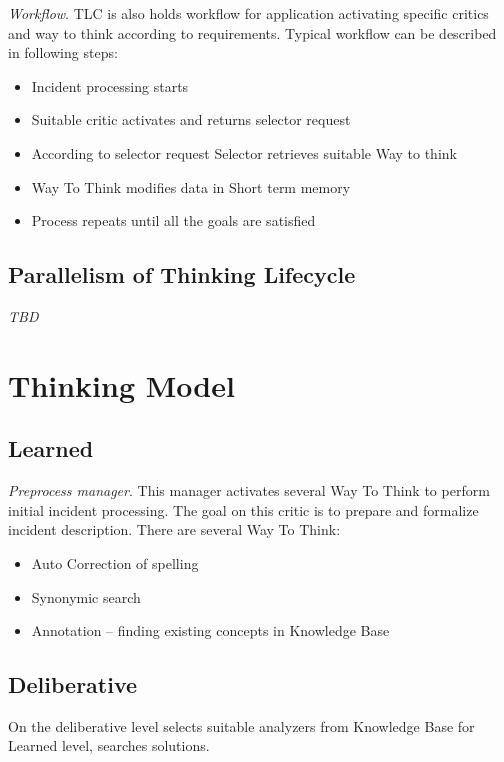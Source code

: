 \documentclass[12pt]{article}
\begin{document}
\emph{Workflow}. TLC is also holds workflow for application activating specific critics and way to think according to requirements. Typical workflow can be described in following steps:

\begin{itemize}
 \item Incident processing starts
 \item Suitable critic activates and returns selector request
 \item According to selector request Selector retrieves suitable Way to think
 \item Way To Think modifies data in Short term memory
 \item Process repeats until all the goals are satisfied
\end{itemize}

\subsection{Parallelism of Thinking Lifecycle}

\emph{TBD}

\section{Thinking Model}

\subsection{Learned}

\emph{Preprocess manager}. This manager activates several Way To Think to perform initial incident processing. The goal on this critic is to prepare and formalize incident description. There are several Way To Think:
\begin{itemize}
 \item Auto Correction of spelling
 \item Synonymic search
 \item Annotation – finding existing concepts in Knowledge Base
\end{itemize}

\subsection{Deliberative}

On the deliberative level selects suitable analyzers from Knowledge Base for Learned level, searches solutions.
\end{document}
